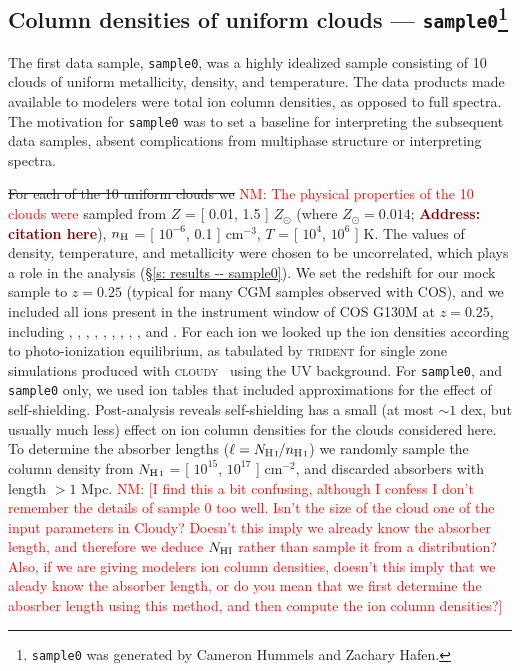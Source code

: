\documentclass[fleqn,usenatbib]{mnras}
\newcommand{\todo}[1]{\textcolor{Maroon}{\textbf{Address: #1}}}
\newcommand{\nmr}[1]{\textcolor{red}{NM: #1}}
\begin{document}
\subsection[Column densities of uniform clouds --- \texttt{sample0}]{Column densities of uniform clouds --- \texttt{sample0}\footnote{
\texttt{sample0} was generated by Cameron Hummels and Zachary Hafen.}}
\label{s: data generation -- sample0}

The first data sample, \texttt{sample0}, was a highly idealized sample consisting of 10 clouds of uniform metallicity, density, and temperature.
The data products made available to modelers were total ion column densities, as opposed to full spectra.
The motivation for \texttt{sample0} was to set a baseline for interpreting the subsequent data samples, absent complications from multiphase structure or interpreting spectra.

\sout{For each of the 10 uniform clouds we} \nmr{The physical properties of the 10 clouds were} sampled from $Z$ = [ 0.01, 1.5 ] $Z_\odot$ (where $Z_\odot = 0.014$; \todo{citation here}), $n_{\rm H}$ = [ $10^{-6}$, 0.1 ] cm$^{-3}$, $T$ = [ $10^4$, $10^6$ ] K.
The values of density, temperature, and metallicity were chosen to be uncorrelated, which plays a role in the analysis (\S\ref{s: results -- sample0}).
We set the redshift for our mock sample to $z=0.25$ (typical for many CGM samples observed with COS), and we included all ions present in the instrument window of COS G130M at $z=0.25$, including , , , , , , ,  , , and .
For each ion we looked up the ion densities according to photo-ionization equilibrium, as tabulated by \textsc{trident} for single zone simulations produced with \textsc{cloudy}~\citep{Ferland2013} using the \cite{Haardt2012} UV background.
For \texttt{sample0}, and \texttt{sample0} only, we used ion tables that included approximations for the effect of self-shielding.
Post-analysis reveals self-shielding has a small (at most $\sim 1$ dex, but usually much less) effect on ion column densities for the clouds considered here.
To determine the absorber lengths ($\ell = N_{\ion{H}{I}} / n_{\ion{H}{I}}$) we randomly sample the  column density from $N_{\ion{H}{I}}$ = [ $10^{15}$, $10^{17}$ ] cm$^{-2}$, and discarded absorbers with length $> 1$ Mpc. \nmr{[I find this a bit confusing, although I confess I don't remember the details of sample 0 too well. Isn't the size of the cloud one of the input parameters in Cloudy? Doesn't this imply we already know the absorber length, and therefore we deduce $N_{\rm HI}$ rather than sample it from a distribution? Also, if we are giving modelers ion column densities, doesn't this imply that we aleady know the absorber length, or do you mean that we first determine the abosrber length using this method, and then compute the ion column densities?]} 
\end{document}

